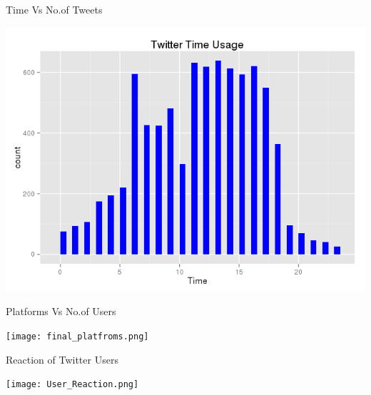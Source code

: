 \documentclass[14pt]{beamer}
\begin{document}
\begin{frame}{Time Vs No.of Tweets}
  \begin{center}
    \includegraphics[scale=0.6]{twitter_time.png}
  \end{center}
\end{frame}
\begin{frame}{Platforms Vs No.of Users}
  \begin{center}
\texttt{[image: final\_platfroms.png]}
  \end{center}
\end{frame}

\begin{frame}{Reaction of Twitter Users}
  \begin{center}
\texttt{[image: User\_Reaction.png]}
  \end{center}
\end{frame}
\end{document}
